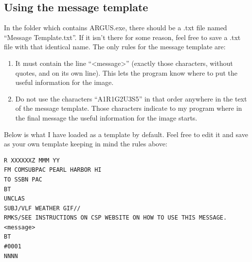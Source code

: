 \subsection{Using the message template}
In the folder which contains ARGUS.exe, there should be a .txt file named ``Message Template.txt''.  If it isn't there for some reason, feel free to save a .txt file with that identical name. The only rules for the message template are:
\begin{enumerate}
    \item It must contain the line ``\textless message\textgreater '' (exactly those characters, without quotes, and on its own line).  This lets the program know where to put the useful information for the image.
    \item Do not use the characters ``A1R1G2U3S5'' in that order anywhere in the text of the message template.  Those characters indicate to my program where in the final message the useful information for the image starts.
\end{enumerate}

\begin{addnote} Below is what I have loaded as a template by default. Feel free to edit it and save as your own template keeping in mind the rules above:\end{addnote}
\begin{lstlisting}[numbers=none,rulecolor=\color{black}]
R XXXXXXZ MMM YY
FM COMSUBPAC PEARL HARBOR HI
TO SSBN PAC
BT
UNCLAS
SUBJ/VLF WEATHER GIF//
RMKS/SEE INSTRUCTIONS ON CSP WEBSITE ON HOW TO USE THIS MESSAGE.
<message>
BT
#0001
NNNN
\end{lstlisting}

